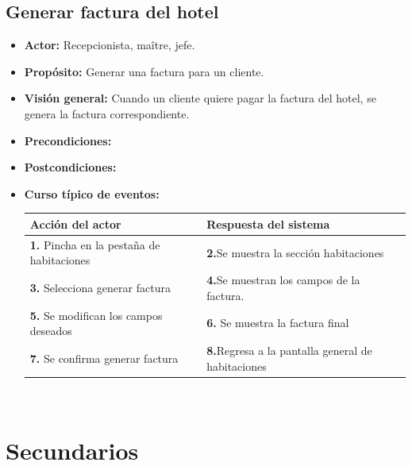 \documentclass[spanish,a4paper,11pt, twoside]{report}	%
\begin{document}
	\subsection{Generar factura del hotel}
		\begin{itemize}
			\item \textbf{Actor:} Recepcionista, maître, jefe.
			\item \textbf{Propósito:} Generar una factura para un cliente.
			\item \textbf{Visión general:} Cuando un cliente quiere pagar la factura del hotel, se genera la factura correspondiente.
			\item \textbf{Precondiciones:} 
			\item \textbf{Postcondiciones:} 
			\item \textbf{Curso típico de eventos:} 	\\
				\begin{tabular}{|p{6cm}||p{6cm}|}
				\hline
				\textbf{Acción del actor} & \textbf{Respuesta del sistema} \\ \hline
				\textbf{1.} Pincha en la pestaña de habitaciones & \textbf{2.}Se muestra la sección habitaciones \\ \hline 
				\textbf{3.} Selecciona generar factura & \textbf{4.}Se muestran los campos de la factura.  \\ \hline
				\textbf{5.} Se modifican los campos deseados & \textbf{6.} Se muestra la factura final \\ \hline
				\textbf{7.} Se confirma generar factura & \textbf{8.}Regresa a la pantalla general de habitaciones\\ \hline
			\end{tabular}
			\\
		\end {itemize}

\newpage

\section{Secundarios}	

\end{document}
